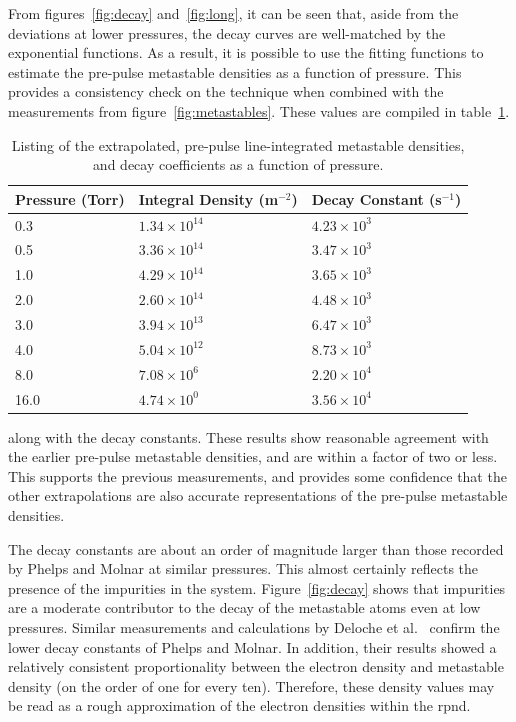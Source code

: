 From figures~\ref{fig:decay} and~\ref{fig:long}, it can be seen that, aside from
the deviations at lower pressures, the decay curves are well-matched by the
exponential functions. As a result, it is possible to use the fitting functions
to estimate the pre-pulse metastable densities as a function of pressure. This
provides a consistency check on the technique when combined with the
measurements from figure~\ref{fig:metastables}. These values are compiled in
table~\ref{tbl:prepulse}.
\begin{table}
  \centering
  \caption{Listing of the extrapolated, pre-pulse line-integrated metastable 
  densities, and decay coefficients as a function of pressure.}
  \begin{tabular}{lll}
    \toprule
    Pressure (Torr) & Integral Density (m$^{-2}$) & Decay Constant (s$^{-1}$) \\
    \midrule
    0.3  & $1.34\times10^{14}$ & $4.23\times10^3$ \\
    0.5  & $3.36\times10^{14}$ & $3.47\times10^3$ \\
    1.0  & $4.29\times10^{14}$ & $3.65\times10^3$ \\
    2.0  & $2.60\times10^{14}$ & $4.48\times10^3$ \\
    3.0  & $3.94\times10^{13}$ & $6.47\times10^3$ \\
    4.0  & $5.04\times10^{12}$ & $8.73\times10^3$ \\
    8.0  & $7.08\times10^{6}$  & $2.20\times10^4$ \\
    16.0 & $4.74\times10^{0}$  & $3.56\times10^4$ \\
    \bottomrule
  \end{tabular}
  \label{tbl:prepulse}
\end{table}
along with the decay constants. These results show reasonable agreement with the
earlier pre-pulse metastable densities, and are within a factor of two or less.
This supports the previous measurements, and provides some confidence that the
other extrapolations are also accurate representations of the pre-pulse
metastable densities.

The decay constants are about an order of magnitude larger than those recorded
by Phelps and Molnar \cite{Phelps1953} at similar pressures. This almost
certainly reflects the presence of the impurities in the system.
Figure~\ref{fig:decay} shows that impurities are a moderate contributor to the
decay of the metastable atoms even at low pressures. Similar measurements and
calculations by Deloche et al.~\cite{Deloche1976} confirm the lower decay
constants of Phelps and Molnar. In addition, their results showed a relatively
consistent proportionality between the electron density and metastable density
(on the order of one for every ten). Therefore, these density values may be read
as a rough approximation of the electron densities within the \acs{rpnd}.

